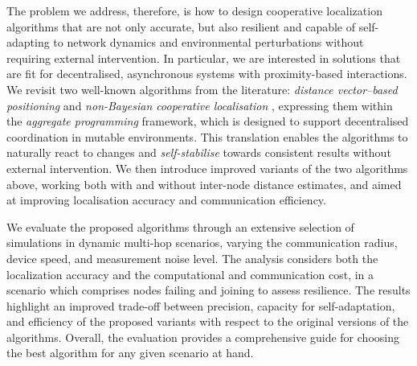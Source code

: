 \documentclass[runningheads]{llncs}
\begin{document}
The problem we address, therefore, is how to design cooperative localization algorithms that are not only accurate, but also resilient and capable of self-adapting to network dynamics and environmental perturbations without requiring external intervention. In particular, we are interested in solutions that are fit for decentralised, asynchronous systems with proximity-based interactions.
We revisit two well-known algorithms from the literature: \emph{distance vector–based positioning} and \emph{non-Bayesian cooperative localisation} \cite{DBLP:journals/pieee/WymeerschLW09,DBLP:journals/telsys/NiculescuN03}, expressing them within the \emph{aggregate programming} \cite{BPV-COMPUTER2015} framework, which is designed to support decentralised coordination in mutable environments. This translation enables the algorithms to naturally react to changes and \emph{self-stabilise} towards consistent results without external intervention. We then introduce improved variants of the two algorithms above, working both with and without inter-node distance estimates, and aimed at improving localisation accuracy and communication efficiency. 

We evaluate the proposed algorithms through an extensive selection of simulations in dynamic multi-hop scenarios, varying the communication radius, device speed, and measurement noise level. The analysis considers both the localization accuracy and the computational and communication cost, in a scenario which comprises nodes failing and joining to assess resilience. The results highlight an improved trade-off between precision, capacity for self-adaptation, and efficiency of the proposed variants with respect to the original versions of the algorithms. Overall, the evaluation provides a comprehensive guide for choosing the best algorithm for any given scenario at hand.
\end{document}
